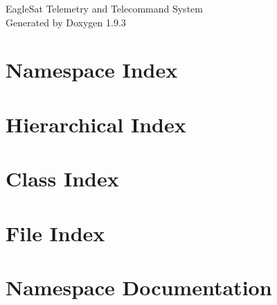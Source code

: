 \documentclass[twoside]{book}
\newcommand{\+}{\discretionary{\mbox{\scriptsize$\hookleftarrow$}}{}{}}
\newcommand{\clearemptydoublepage}{%
    \newpage{\pagestyle{empty}\cleardoublepage}%
  }
\begin{document}
  \raggedbottom
    \hypersetup{pageanchor=false,
                bookmarksnumbered=true,
                pdfencoding=unicode
               }
  \begin{titlepage}
  \vspace*{7cm}
  \begin{center}%
  {\Large Eagle\+Sat Telemetry and Telecommand System}\\
  \vspace*{1cm}
  {\large Generated by Doxygen 1.9.3}\\
  \end{center}
  \end{titlepage}
  \clearemptydoublepage
  \tableofcontents
  \clearemptydoublepage
  \hypersetup{pageanchor=true}
\chapter{Namespace Index}

\chapter{Hierarchical Index}

\chapter{Class Index}

\chapter{File Index}

\chapter{Namespace Documentation}




















\end{document}
